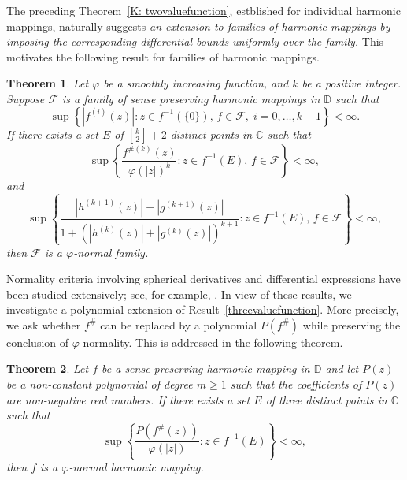 \documentclass[11pt, reqno]{amsart}
\numberwithin{equation}{section}
\theoremstyle{definition}
\theoremstyle{remark}
\theoremstyle{plain}
\newtheorem{theorem}{Theorem}[section]
\begin{document}
The preceding Theorem~\ref{K: twovaluefunction}, estblished for 
individual harmonic mappings, naturally suggests {\it an extension 
to families of harmonic mappings by imposing the corresponding
differential bounds uniformly over the family.} This motivates
the following result for families of harmonic mappings.
\begin{theorem}\label{K: twovaluefamily}
Let $\varphi$ be a smoothly increasing function, and
$k$ be a positive integer. Suppose $\mathcal{F}$ is a family 
of sense preserving harmonic mappings in $\mathbb{D}$ such that
\begin{equation}\label{eq:K: 1twovaluefunction}
\sup\left\{
|f^{(i)}(z)|:
z\in f^{-1}(\{0\}),\, f \in \mathcal{F}, \;
i=0,\ldots,k-1
\right\}<\infty.
\end{equation}
If there exists a set $E$ of $\left[\frac{k}{2}\right]+2$
 distinct points in $\mathbb{C}$ such that
\begin{equation}\label{eq:K: 2twovaluefamily}
\sup\left\{
\frac{f^{\#(k)}(z)}{\varphi(|z|)^k}
:
z\in f^{-1}(E), \, f \in \mathcal{F}
\right\}
<\infty,
\end{equation}
and
\begin{equation}\label{eq:K: 3twovaluefamily}
\sup\left\{
\frac{|h^{(k+1)}(z)|+|g^{(k+1)}(z)|}
{1+\left(|h^{(k)}(z)|+|g^{(k)}(z)|\right)^{k+1}}
:
z\in f^{-1}(E), \, f \in \mathcal{F}
\right\}
<\infty,
\end{equation}
then $\mathcal{F}$ is a $\varphi$-normal family.
\end{theorem}
 
 Normality criteria involving spherical derivatives and
 differential expressions have been studied extensively;
 see, for example, \cite{chenlappan,Tanthin}. In view of these
results, we investigate a polynomial extension of Result~\ref{threevaluefunction}.
More precisely, we ask whether $f^\#$ can be replaced by a polynomial $P(f^\#)$
while preserving the conclusion of $\varphi$-normality. This is addressed in
the following theorem.
\begin{theorem}\label{threevaluepoly}
Let $f$ be a sense-preserving harmonic mapping in $\mathbb{D}$ and
 let $P(z)$ be a non-constant polynomial of degree $m \geq 1$ such 
 that
  the coefficients of $P(z)$ are non-negative real numbers. If there 
  exists a set $E$ of three distinct points in $\mathbb{C}$ such that
\begin{equation}\label{eq: threevaluepoly}
\sup \left\{
\frac{P\!\left(f^{\#}(z)\right)}{\varphi(|z|)}
: z \in f^{-1}(E)
\right\}
< \infty,
\end{equation}
then $f$ is a $\varphi$-normal harmonic mapping.
\end{theorem}
\end{document}
